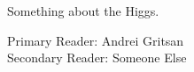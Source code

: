 Something about the Higgs.

\vspace{1cm}

\noindent Primary Reader: Andrei Gritsan\\
Secondary Reader: Someone Else
